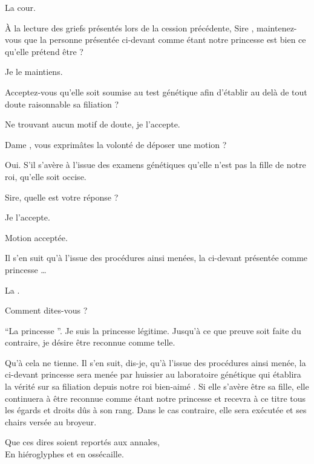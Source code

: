 \begin{drama}

  \huissierspeaks La cour.

  \nobleOnespeaks À la lecture des griefs présentés lors de la cession précédente, Sire \roi, maintenez-vous que la personne présentée ci-devant comme étant notre princesse \princesse{} est bien ce qu’elle prétend être ?

  \roispeaks Je le maintiens.

  \nobleTwospeaks Acceptez-vous qu’elle soit soumise au test génétique afin d’établir au delà de tout doute raisonnable sa filiation ?

  \roispeaks Ne trouvant aucun motif de doute, je l’accepte.

  \nobleTreespeaks Dame \reine{}, vous exprimâtes la volonté de déposer une motion ?

  \reinespeaks Oui. S’il s’avère à l’issue des examens génétiques qu’elle n’est pas la fille de notre roi, qu’elle soit occise.

  \nobleOnespeaks Sire, quelle est votre réponse ?

  \roispeaks Je l’accepte.

   Motion acceptée.

  \nobleOnespeaks Il s’en suit qu’à l’issue des procédures ainsi menées, la ci-devant présentée comme  princesse \princesse{}…

  \elaspeaks La .

  \nobleOnespeaks Comment dites-vous ?

  \elaspeaks \enquote{La  princesse \princesse{}}. Je suis la princesse légitime. Jusqu’à ce que preuve soit faite du contraire, je désire être reconnue comme telle.

  \nobleOnespeaks Qu’à cela ne tienne. Il s’en suit, dis-je, qu’à l’issue des procédures ainsi menée, la ci-devant    princesse \princesse{} sera menée par huissier au laboratoire génétique qui établira la vérité sur sa filiation depuis notre roi bien-aimé \roi. Si elle s’avère être sa fille, elle continuera à être reconnue comme étant notre princesse \princesse{} et recevra à ce titre tous les égards et droits dûs à son rang. Dans le cas contraire, elle sera exécutée et ses chairs versée au broyeur.

  \begin{minipage}[t]{\linewidth}
    Que ces dires soient reportés aux annales,\\
    En hiéroglyphes et en ossécaille.
  \end{minipage}
\end{drama}

